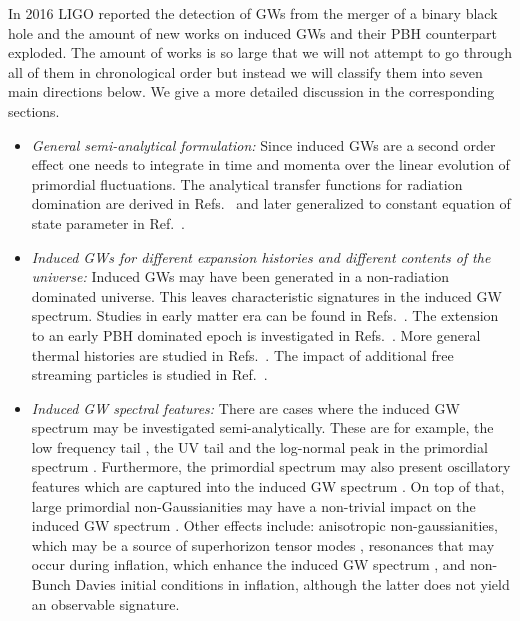\documentclass[a4paper,11pt]{article}
\numberwithin{equation}{section}
\begin{document}
In 2016 LIGO reported the detection of GWs from the merger of a binary black hole \cite{Abbott:2016nmj} and the amount of new works on induced GWs and their PBH counterpart exploded. The amount of works is so large that we will not attempt to go through all of them in chronological order but instead we will classify them into seven main directions below. We give a more detailed discussion in the corresponding sections.
\begin{itemize}
\item[--] \textit{General semi-analytical formulation:} Since induced GWs are a second order effect one needs to integrate in time and momenta over the linear evolution of primordial fluctuations. The analytical transfer functions for radiation domination are derived in Refs.~\cite{Espinosa:2018eve,Kohri:2018awv} and later generalized to constant equation of state parameter in Ref.~\cite{Domenech:2019quo}.
\item[--] \textit{Induced GWs for different expansion histories and different contents of the universe:} Induced GWs may have been generated in a non-radiation dominated universe. This leaves characteristic signatures in the induced GW spectrum. Studies in early matter era can be found in Refs.~\cite{Inomata:2019zqy,Inomata:2019ivs,Dalianis:2020gup}. The extension to an early PBH dominated epoch is investigated in Refs.~\cite{Inomata:2020lmk,Papanikolaou:2020qtd,Domenech:2020ssp,Domenech:2021wkk}. More general thermal histories are studied in Refs.~\cite{Hajkarim:2019nbx,Bhattacharya:2019bvk,Domenech:2019quo,Domenech:2020kqm,Dalianis:2020cla,Abe:2020sqb}. The impact of additional free streaming particles is studied in Ref.~\cite{Hook:2020phx}.
\item[--] \textit{Induced GW spectral features:} There are cases where the induced GW spectrum may be investigated semi-analytically. These are for example, the low frequency tail \cite{Cai:2019cdl,Yuan:2019wwo,Domenech:2020kqm}, the UV tail \cite{Liu:2020oqe,Atal:2021jyo} and the log-normal peak in the primordial spectrum \cite{Pi:2020otn}. Furthermore, the primordial spectrum may also present oscillatory features which are captured into the induced GW spectrum \cite{Cai:2019amo,Fumagalli:2020nvq,Braglia:2020eai,Braglia:2020taf,Fumagalli:2021cel}. On top of that, large primordial non-Gaussianities may have a non-trivial impact on the induced GW spectrum \cite{Garcia-Bellido:2017aan,Cai:2018dig,Unal:2018yaa,Yuan:2020iwf,Atal:2021jyo,Adshead:2021hnm,Ragavendra:2021qdu}. Other effects include: anisotropic non-gaussianities, which may be a source of superhorizon tensor modes \cite{Ota:2020vfn}, resonances that may occur during inflation, which enhance the induced GW spectrum \cite{Cai:2019jah,Cai:2019bmk,Zhou:2020kkf,Cai:2021yvq}, and non-Bunch Davies initial conditions in inflation\cite{Ragavendra:2020vud}, although the latter does not yield an observable signature.

\end{itemize}
\end{document}
